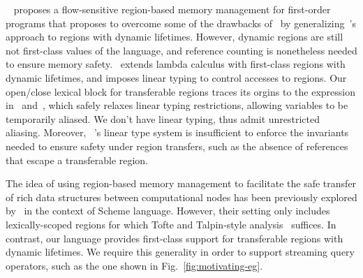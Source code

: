 ~\cite{HMN01} proposes a flow-sensitive region-based memory management
for first-order programs that proposes to overcome some of the
drawbacks of~\cite{tofte97} by generalizing~\cite{tofte97}'s approach
to regions with dynamic lifetimes. However, dynamic regions are still
not first-class values of the language, and reference counting is
nonetheless needed to ensure memory safety.~\cite{WW01} extends lambda
calculus with first-class regions with dynamic lifetimes, and imposes
linear typing to control accesses to regions. Our open/close lexical
block for transferable regions traces its orgins to the 
expression in~\cite{WW01} and~\cite{wadler90}, which safely relaxes
linear typing restrictions, allowing variables to be temporarily
aliased. We don't have linear typing, thus admit unrestricted
aliasing. 
Moreover, ~\cite{WW01}'s linear type system is insufficient to enforce
the invariants needed to ensure safety under region transfers, such as
the absence of references that escape a transferable region.

The idea of using region-based memory management to facilitate the
safe transfer of rich data structures between computational nodes has
been previously explored by~\cite{gpu14} in the context of Scheme
language. However, their setting only includes lexically-scoped
regions for which Tofte and Talpin-style analysis~\cite{tofte97}
suffices. In contrast, our language provides first-class support for
transferable regions with dynamic lifetimes. We require this
generality in order to support streaming query operators, such as the
one shown in Fig.~\ref{fig:motivating-eg}. 

